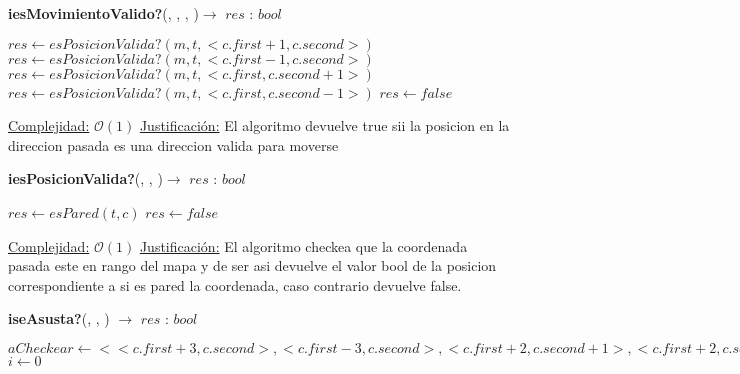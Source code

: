 \documentclass[10pt, a4paper]{article}
\begin{document}
\begin{Algoritmos}
    \begin{algorithm}{\textbf{iesMovimientoValido?}(, , , )$\to$ $res$ : $bool$}
        \begin{algorithmic}
                \State $res \gets esPosicionValida?(m, t, <c.first+1, c.second>)$
            \Else
                    \State $res \gets esPosicionValida?(m, t, <c.first-1, c.second>)$
                \Else
                        \State $res \gets esPosicionValida?(m, t, <c.first, c.second+1>)$
                    \Else
                        \State $res \gets esPosicionValida?(m, t, <c.first, c.second-1>)$
                    \Else
                        \State $res \gets false$
            \EndIf

            
            \Statex \underline{Complejidad:} $\mathcal{O}(1)$
            \Statex \underline{Justificación:} El algoritmo devuelve true sii la posicion en la direccion pasada es una direccion valida para moverse
        \end{algorithmic}
    \end{algorithm}
    
    \begin{algorithm}{\textbf{iesPosicionValida?}(, , )$\to$ $res$ : $bool$}
        \begin{algorithmic}
				\State $res \gets esPared(t, c)$
			\Else
				\State $res \gets false$	
			\EndIf
            
            \Statex \underline{Complejidad:} $\mathcal{O}(1)$
            \Statex \underline{Justificación:} El algoritmo checkea que la coordenada pasada este en rango del mapa y de ser asi devuelve el valor bool de la posicion correspondiente a si es pared la coordenada, caso contrario devuelve false.
        \end{algorithmic}
    \end{algorithm}
    
    \begin{algorithm}[H]{\textbf{iseAsusta?}(, , ) $\to$ $res$ : $bool$}	
	\begin{algorithmic}
			\State $aCheckear \gets <<c.first+3, c.second>, <c.first-3, c.second>, <c.first+2, c.second+1>, <c.first+2, c.second-1>, <c.first-2, c.second+1>, <c.first-2, c.second-1>, <c.first+1, c.second+2>, <c.first+1, c.second-2>, <c.first-1, c.second+2>, <c.first-1, c.second-2>, <c.first, c.second+3>, <c.first, c.second-3>>$
			\State $i \gets 0$
			

\end{algorithmic}
\end{algorithm}
\end{Algoritmos}
\end{document}
